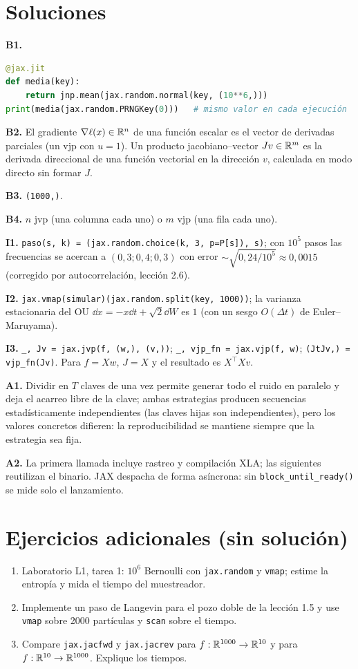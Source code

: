\documentclass[11pt,a4paper]{article}
\begin{document}
\section{Soluciones}
\begin{solucion}
\textbf{B1.}
\begin{lstlisting}[language=Python]
@jax.jit
def media(key):
    return jnp.mean(jax.random.normal(key, (10**6,)))
print(media(jax.random.PRNGKey(0)))   # mismo valor en cada ejecución
\end{lstlisting}
\textbf{B2.} El gradiente $\nabla\ell(x)\in\mathbb{R}^n$ de una función escalar es el vector de derivadas parciales (un vjp con $u=1$). Un producto jacobiano--vector $Jv\in\mathbb{R}^m$ es la derivada direccional de una función vectorial en la dirección $v$, calculada en modo directo sin formar $J$.

\textbf{B3.} \texttt{(1000,)}.

\textbf{B4.} $n$ jvp (una columna cada uno) o $m$ vjp (una fila cada uno).

\textbf{I1.} \texttt{paso(s, k) = (jax.random.choice(k, 3, p=P[s]), s)}; con $10^5$ pasos las frecuencias se acercan a $(0{,}3;0{,}4;0{,}3)$ con error $\sim\sqrt{0{,}24/10^5}\approx0{,}0015$ (corregido por autocorrelación, lección 2.6).

\textbf{I2.} \texttt{jax.vmap(simular)(jax.random.split(key, 1000))}; la varianza estacionaria del OU $\dd x=-x\dd t+\sqrt2\dd W$ es $1$ (con un sesgo $O(\Delta t)$ de Euler--Maruyama).

\textbf{I3.} \texttt{\_, Jv = jax.jvp(f, (w,), (v,))}; \texttt{\_, vjp\_fn = jax.vjp(f, w)}; \texttt{(JtJv,) = vjp\_fn(Jv)}. Para $f=Xw$, $J=X$ y el resultado es $X^\top Xv$.

\textbf{A1.} Dividir en $T$ claves de una vez permite generar todo el ruido en paralelo y deja el acarreo libre de la clave; ambas estrategias producen secuencias estadísticamente independientes (las claves hijas son independientes), pero los valores concretos difieren: la reproducibilidad se mantiene siempre que la estrategia sea fija.

\textbf{A2.} La primera llamada incluye rastreo y compilación XLA; las siguientes reutilizan el binario. JAX despacha de forma asíncrona: sin \texttt{block\_until\_ready()} se mide solo el lanzamiento.
\end{solucion}

\section{Ejercicios adicionales (sin solución)}
\begin{enumerate}[label=\textbf{P\arabic*.}]
\item Laboratorio L1, tarea 1: $10^6$ Bernoulli con \texttt{jax.random} y \texttt{vmap}; estime la entropía y mida el tiempo del muestreador.
\item Implemente un paso de Langevin para el pozo doble de la lección 1.5 y use \texttt{vmap} sobre 2000 partículas y \texttt{scan} sobre el tiempo.
\item Compare \texttt{jax.jacfwd} y \texttt{jax.jacrev} para $f:\mathbb{R}^{1000}\to\mathbb{R}^{10}$ y para $f:\mathbb{R}^{10}\to\mathbb{R}^{1000}$. Explique los tiempos.
\end{enumerate}
\end{document}
